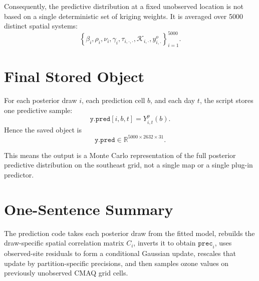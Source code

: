 \documentclass[11pt]{article}
\newcommand{\R}{\mathbb{R}}
\begin{document}
Consequently, the predictive distribution at a fixed unobserved location is not
based on a single deterministic set of kriging weights. It is averaged over
5000 distinct spatial systems:
\[
\left\{
\beta_i,\rho_i,\nu_i,\gamma_i,\tau_{i,\cdot,\cdot},
\mathcal{K}_{i,\cdot},y^o_{i,\cdot}
\right\}_{i=1}^{5000}.
\]

\section{Final Stored Object}

For each posterior draw \(i\), each prediction cell \(b\), and each day \(t\),
the script stores one predictive sample:
\[
\texttt{y.pred}[i,b,t] = Y^p_{i,t}(b).
\]
Hence the saved object is
\[
\texttt{y.pred} \in \R^{5000 \times 2632 \times 31}.
\]

This means the output is a Monte Carlo representation of the full posterior
predictive distribution on the southeast grid, not a single map or a single
plug-in predictor.

\section{One-Sentence Summary}

The prediction code takes each posterior draw from the fitted model, rebuilds
the draw-specific spatial correlation matrix \(C_i\), inverts it to obtain
\(\texttt{prec}_i\), uses observed-site residuals to form a conditional
Gaussian update, rescales that update by partition-specific precisions, and
then samples ozone values on previously unobserved CMAQ grid cells.
\end{document}
